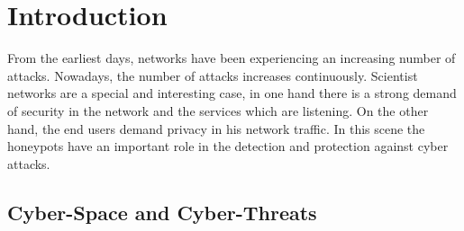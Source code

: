 \documentclass[a4paper]{llncs}
\begin{document}
\begin{abstract}
\end{abstract}


\section{Introduction}
From the earliest days, %
  networks have been experiencing an increasing number of
  attacks. Nowadays, %
the number of attacks increases continuously\cite{esset-tendencias,cni-ccn-tendencias-2014}. Scientist networks are a special and interesting case, %
in one hand there is a strong demand of security in the network and the services which are listening. On the other hand, the end users demand privacy in his network traffic. In this scene the honeypots have an important role in the detection and protection against cyber attacks.

\subsection{Cyber-Space and Cyber-Threats}
\label{sect:Scientist Networks}
\end{document}
